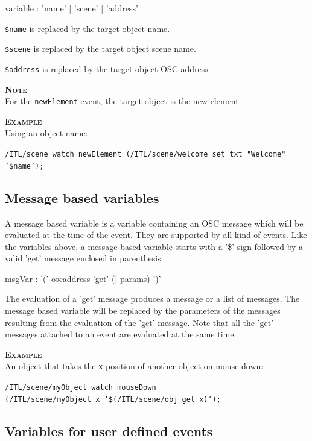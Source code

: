 \documentclass[a4paper,twoside]{report}
\newcommand{\subsublevel}[1]	{\subsection{#1}}
\newcommand{\OSC}[1]		{\texttt{#1}}
\newcommand{\values}[1]		{\texttt{#1}}
\newcommand{\example}		{\textbf{\hspace{-1.5cm}\textbf{\textsc{Example }}}}
\newcommand{\note}	[1]		{\vspace{2mm}\textbf{\hspace{-0.9cm}\textbf{\textsc{Note #1}}}}
\let\olditemize\itemize
\let\oldenditemize\enditemize
\renewenvironment{itemize} 	{\olditemize \setlength{\itemsep}{1mm}}{\oldenditemize}
\newcommand{\sample}	[1]			{\vspace{-2mm}\begin{center}\colorbox{mygrey}{
								\begin{minipage}[t]{0.9\columnwidth} 
								{\small \texttt{#1}}
								\end{minipage}}\end{center}}
\begin{document}
\begin{rail} 
variable :  'name' | 'scene' | 'address'
\end{rail}

\begin{itemize}
\item \OSC{\$name} is replaced by the target object name.
\item \OSC{\$scene} is replaced by the target object scene name.
\item \OSC{\$address} is replaced by the target object OSC address. 
\end{itemize}

\note{} \\
For the \OSC{newElement} event, the target object is the new element. 

\example \\
Using an object name:
\sample{/ITL/scene watch newElement (/ITL/scene/welcome set txt "Welcome" '\$name');}

\subsublevel{Message based variables}
\label{msgvar}

A message based variable is a variable containing an OSC message which will be evaluated at the time of the event. They are supported by all kind of events. Like  the variables above, a message based variable starts with a '\$' sign followed by a valid 'get' message enclosed in parenthesis:
\begin{rail} 
msgVar : '(' oscaddress 'get' (| params) ')'
\end{rail}

The evaluation of a 'get' message produces a message or a list of messages. The message based variable will be replaced by the parameters of the messages resulting from the evaluation of the 'get' message.
Note that all the 'get' messages attached to an event are evaluated at the same time.

\example \\
An object that takes the \values{x} position of another object on mouse down:
\sample{/ITL/scene/myObject watch mouseDown \\
\hspace*{3cm}(/ITL/scene/myObject x '\$(/ITL/scene/obj get x)');}

\subsublevel{Variables for user defined events}
\label{udevar}
\end{document}

